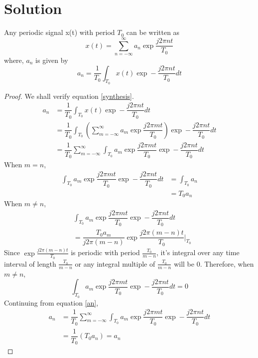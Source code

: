 \documentclass[journal,12pt,twocolumn]{IEEEtran}
\begin{document}
\section{Solution}
\begin{lemma}
Any periodic signal x(t) with period $T_0$ can be written as 
\begin{equation}
    x(t) = \sum_{n=-\infty}^{\infty} a_n \exp \dfrac{j2\pi nt}{T_0}\label{analysis}
\end{equation}
where, $a_n$ is given by
\begin{equation}
    a_n = \dfrac{1}{T_0}\int_{T_0}x(t)\exp-\dfrac{j2\pi nt}{T_0}dt\label{synthesis}
\end{equation}
\end{lemma}
\begin{proof}
We shall verify equation \ref{synthesis}. 
\begin{align}
    a_n &= \dfrac{1}{T_0}\int_{T_0}x(t)\exp-\dfrac{j2\pi nt}{T_0}dt\\
        &= \dfrac{1}{T_0}\int_{T_0}\left(\sum_{m=-\infty}^{\infty} a_m \exp \dfrac{j2\pi mt}{T_0}\right)\exp-\dfrac{j2\pi nt}{T_0}dt\\
        &= \dfrac{1}{T_0}\sum_{m=-\infty}^{\infty}\int_{T_0}a_m \exp \dfrac{j2\pi mt}{T_0}\exp-\dfrac{j2\pi nt}{T_0}dt\label{an}
\end{align}
When $m = n$,
\begin{align}
    \int_{T_0}a_m \exp \dfrac{j2\pi mt}{T_0}\exp-\dfrac{j2\pi nt}{T_0}dt &= \int_{T_0} a_n\\
    &= T_0 a_n
\end{align}
When $m \ne n$,
\begin{align}
    &\int_{T_0}a_m \exp \dfrac{j2\pi mt}{T_0}\exp-\dfrac{j2\pi nt}{T_0}dt\\ 
    &= \dfrac{T_0a_m}{j2\pi (m-n)}\exp \dfrac{j2\pi (m-n)t}{T_0} \biggr \vert_{T_0}
\end{align}
Since $\exp \frac{j2\pi (m-n)t}{T_0}$ is periodic with period $\frac{T_0}{m-n}$, it's integral over any time interval of length $\frac{T_0}{m-n}$ or any integral multiple of $\frac{T_0}{m-n}$ will be 0. Therefore, when $m \ne n$,
\begin{equation}
    \int_{T_0}a_m \exp \dfrac{j2\pi mt}{T_0}\exp-\dfrac{j2\pi nt}{T_0}dt = 0
\end{equation}
Continuing from equation \ref{an},
\begin{align}
    a_n &=  \dfrac{1}{T_0}\sum_{m=-\infty}^{\infty}\int_{T_0}a_m \exp \dfrac{j2\pi mt}{T_0}\exp-\dfrac{j2\pi nt}{T_0}dt\\
    &= \dfrac{1}{T_0}(T_0a_n) = a_n
\end{align}
\end{proof}
\end{document}
